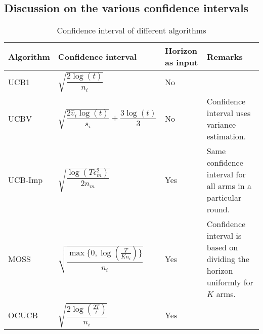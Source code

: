 \subsection{Discussion on the various confidence intervals}



\begin{table}[!ht]
\caption{Confidence interval of different algorithms}
\label{tab:conf-comp}
\begin{center}
\begin{tabular}{|p{5em}|p{10em}|p{4em}|p{12em}|}
\hline
Algorithm  &  Confidence interval & Horizon as input & Remarks \\
\hline
\hline
UCB1        & $\sqrt{\dfrac{2\log (t)}{n_i}}$ & No & \\%
\hline
\hline
UCBV        & $\sqrt{\dfrac{2\hat{v}_i\log (t)}{s_i}} + \dfrac{3\log (t)}{3}$ & No & Confidence interval uses variance estimation.\\
\hline
\hline
UCB-Imp 		& $\sqrt{\dfrac{\log{( T\epsilon_{m}^{2})}}{2 n_{m}}}$ & Yes & Same confidence interval for all arms in a particular round.\\%
\hline
\hline
MOSS	     	& $\sqrt{\dfrac{\max\lbrace 0,\log(\frac{T}{K n_i})\rbrace}{n_i}}$ & Yes & Confidence interval is based on dividing the horizon uniformly for $K$ arms.\\%
\hline
\hline
OCUCB     	& $\sqrt{\dfrac{2\log(\frac{2T}{t})}{n_i}}$ & Yes & \\\midrule
\end{tabular}
\end{center}
\end{table} 